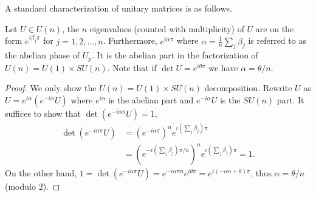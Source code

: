 


A standard characterization of unitary matrices is as follows.

\begin{lemma}
  Let $U \in U(n)$, the $n$ eigenvalues (counted with multiplicity) of $U$ are on the form $e^{i\beta_jπ}$ for $j = 1,2,\ldots,n$. Furthermore, $e^{i\alpha\pi}$ where $\alpha = \frac{1}{n}\sum_j \beta_j$ is referred to as the abelian phase of $U_p$. It is the abelian part in the factorization of $U(n) = U(1) \times SU(n)$. Note that if $\det U = e^{iθπ}$ we have $α = θ/n$.
\end{lemma}

\begin{proof}
  We only show the $U(n) = U(1) \times SU(n)$ decomposition.
  Rewrite $U$ as $U = e^{i\alpha}\left( e^{-i\alpha} U \right)$ where $e^{i\alpha}$ is the abelian part and $e^{-i\alpha} U$ is the $SU(n)$ part. It suffices to show that $\det \left( e^{-iαπ} U \right) = 1$,
  \begin{equation}
    \begin{aligned}
      \det \left( e^{-iαπ} U \right)
      &= \left(e^{-iαπ}\right)^n e^{i\left(\sum_j \beta_j\right)π} \\
      &= \left(e^{-i\left(\sum_j \beta_j\right)π/n}\right)^n e^{i\left(\sum_j \beta_j\right)π} = 1.
    \end{aligned}
  \end{equation}
  On the other hand, $1 = \det \left( e^{-iαπ} U \right) = e^{-iαπn} e^{iθπ} = e^{i(-αn+θ)π}$, thus $α = θ/n$ (modulo $2$).
\end{proof}

